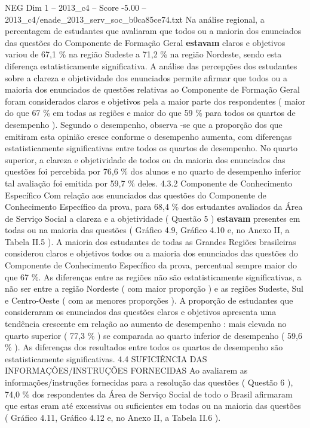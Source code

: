 \begin{textsample}{NEG Dim 1 – 2013\_c4 – Score -5.00 – 2013\_c4/enade\_2013\_serv\_soc\_b0ca85ce74.txt}
Na análise regional, a percentagem de estudantes que avaliaram que todos ou a maioria dos enunciados das questões do Componente de Formação Geral \textbf{estavam} claros e objetivos variou de 67,1 \% na região Sudeste a 71,2 \% na região Nordeste, sendo esta diferença estatisticamente significativa.
A análise das percepções dos estudantes sobre a clareza e objetividade dos enunciados permite afirmar que todos ou a maioria dos enunciados de questões relativas ao Componente de Formação Geral foram considerados claros e objetivos pela a maior parte dos respondentes ( maior do que 67 \% em todas as regiões e maior do que 59 \% para todos os quartos de desempenho ).
Segundo o desempenho, observa -se que a proporção dos que emitiram esta opinião cresce conforme o desempenho aumenta, com diferenças estatisticamente significativas entre todos os quartos de desempenho.
No quarto superior, a clareza e objetividade de todos ou da maioria dos enunciados das questões foi percebida por 76,6 \% dos alunos e no quarto de desempenho inferior tal avaliação foi emitida por 59,7 \% deles. 4.3.2 Componente de Conhecimento Específico Com relação aos enunciados das questões do Componente de Conhecimento Específico da prova, para 68,4 \% dos estudantes avaliados da Área de Serviço Social a clareza e a objetividade ( Questão 5 ) \textbf{estavam} presentes em todas ou na maioria das questões ( Gráfico 4.9, Gráfico 4.10 e, no Anexo II, a Tabela II.5 ).
A maioria dos estudantes de todas as Grandes Regiões brasileiras considerou claros e objetivos todos ou a maioria dos enunciados das questões do Componente de Conhecimento Específico da prova, percentual sempre maior do que 67 \%.
As diferenças entre as regiões não são estatisticamente significativas, a não ser entre a região Nordeste ( com maior proporção ) e as regiões Sudeste, Sul e Centro-Oeste ( com as menores proporções ).
A proporção de estudantes que consideraram os enunciados das questões claros e objetivos apresenta uma tendência crescente em relação ao aumento de desempenho : mais elevada no quarto superior ( 77,3 \% ) se comparada ao quarto inferior de desempenho ( 59,6 \% ).
As diferenças dos resultados entre todos os quartos de desempenho são estatisticamente significativas. 4.4 SUFICIÊNCIA DAS INFORMAÇÕES/INSTRUÇÕES FORNECIDAS Ao avaliarem as informações/instruções fornecidas para a resolução das questões ( Questão 6 ), 74,0 \% dos respondentes da Área de Serviço Social de todo o Brasil afirmaram que estas eram até excessivas ou suficientes em todas ou na maioria das questões ( Gráfico 4.11, Gráfico 4.12 e, no Anexo II, a Tabela II.6 ).

\end{textsample}
